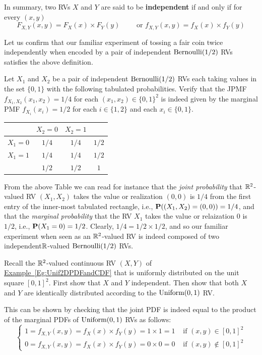 In summary, two RVs $X$ and $Y$ are said to be {\bf independent} if and only if for every $(x,y)$
\[
\boxed{
F_{X,Y}(x,y) = F_X(x) \times F_Y(y) \qquad \text{ or } f_{X,Y}(x,y) = f_X(x) \times f_Y(y)
}
\]

Let us confirm that our familiar experiment of tossing a fair coin twice independently when encoded by a pair of independent $\mbox{{\rm Bernoulli}}(1/2)$ RVs satisfies the above definition.
\begin{example}
Let $X_1$ and $X_2$ be a pair of independent $\mbox{{\rm Bernoulli}}(1/2)$ RVs each taking values in the set $\{0,1\}$ with the following tabulated probabilities. Verify that the JPMF $f_{X_1,X_2}(x_1,x_2)=1/4$ for each $(x_1,x_2) \in \{0,1\}^2$ is indeed given by the marginal PMF $f_{X_i}(x_i)=1/2$ for each $i \in \{1,2\}$ and each $x_i \in \{0,1\}$.

\begin{center}
\begin{tabular}{|c|c c|c|}
\hline
& $X_2=0$ & $X_2=1$ & \\ \hline
$X_1=0$& $1/4$ & $1/4$ & $1/2$ \\
$X_1=1$& $1/4$ & $1/4$ & $1/2$ \\ \hline
& $1/2$ & $1/2$ & $1$\\ \hline
\end{tabular}
\end{center}
From the above Table we can read for instance that the {\em joint probability} that $\mathbb{R}^2$-valued RV $(X_1,X_2)$ takes the value or realization $(0,0)$ is $1/4$ from the first entry of the inner-most tabulated rectangle, 
i.e., $\mathbf{P}((X_1,X_2)=(0,0))=1/4$, 
and that the {\em marginal probability} that the RV $X_1$ takes the value or relaization $0$ is $1/2$, 
i.e., $\mathbf{P}(X_1=0)=1/2$. 
Clearly, $1/4=1/2 \times 1/2$, and so our familiar experiment when seen as an $\mathbb{R}^2$-valued RV is indeed composed of two independent$\mathbb{R}$-valued $\mbox{{\rm Bernoulli}}(1/2)$ RVs. 
\end{example}

\begin{example}
Recall the $\mathbb{R}^2$-valued continuous RV $(X,Y)$ of \hyperref[Eg:Unif2DPDFandCDF]{Example~\ref*{Eg:Unif2DPDFandCDF}} 
that is uniformly distributed on the unit square $[0,1]^2$. 
First show that $X$ and $Y$ independent. 
Then show that both $X$ and $Y$ are identically distributed according to the $\mbox{{\rm Uniform}}(0,1)$ RV. 

This can be shown by checking that the joint PDF is indeed equal to the product of the marginal PDFs of $\mbox{{\rm Uniform}}(0,1)$ RVs as follows:
\[
\begin{cases}
1= f_{X,Y}(x,y) =  f_X(x) \times f_Y(y) = 1 \times 1 = 1 & \text{ if } (x,y) \in [0,1]^2\\
0= f_{X,Y}(x,y) =  f_X(x) \times f_Y(y) = 0 \times 0 = 0 & \text{ if } (x,y) \notin [0,1]^2
\end{cases}
\]
\end{example}

